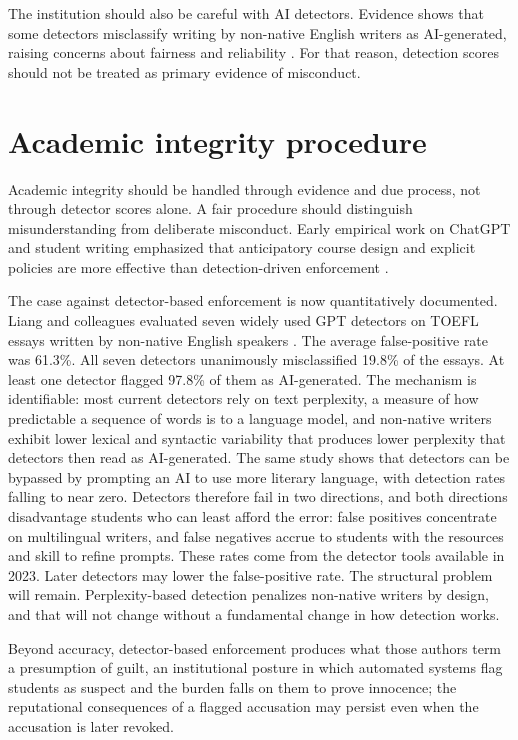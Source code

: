 \documentclass{SIAMbook2023}
\begin{document}
The institution should also be careful with AI detectors. Evidence shows that some detectors misclassify writing by non-native English writers as AI-generated, raising concerns about fairness and reliability \citep{liang2023gpt}. For that reason, detection scores should not be treated as primary evidence of misconduct.

\section{Academic integrity procedure}
\label{u:sec:integrity}%

Academic integrity should be handled through evidence and due process, not through detector scores alone. A fair procedure should distinguish misunderstanding from deliberate misconduct. Early empirical work on ChatGPT and student writing emphasized that anticipatory course design and explicit policies are more effective than detection-driven enforcement \citep{cotton2024chatting}.

The case against detector-based enforcement is now quantitatively documented. Liang and colleagues evaluated seven widely used GPT detectors on TOEFL essays written by non-native English speakers \citep{liang2023gpt}. The average false-positive rate was 61.3\%. All seven detectors unanimously misclassified 19.8\% of the essays. At least one detector flagged 97.8\% of them as AI-generated. The mechanism is identifiable: most current detectors rely on text perplexity, a measure of how predictable a sequence of words is to a language model, and non-native writers exhibit lower lexical and syntactic variability that produces lower perplexity that detectors then read as AI-generated. The same study shows that detectors can be bypassed by prompting an AI to use more literary language, with detection rates falling to near zero. Detectors therefore fail in two directions, and both directions disadvantage students who can least afford the error: false positives concentrate on multilingual writers, and false negatives accrue to students with the resources and skill to refine prompts. These rates come from the detector tools available in 2023. Later detectors may lower the false-positive rate. The structural problem will remain. Perplexity-based detection penalizes non-native writers by design, and that will not change without a fundamental change in how detection works.

Beyond accuracy, detector-based enforcement produces what those authors term a presumption of guilt, an institutional posture in which automated systems flag students as suspect and the burden falls on them to prove innocence; the reputational consequences of a flagged accusation may persist even when the accusation is later revoked.
\end{document}

